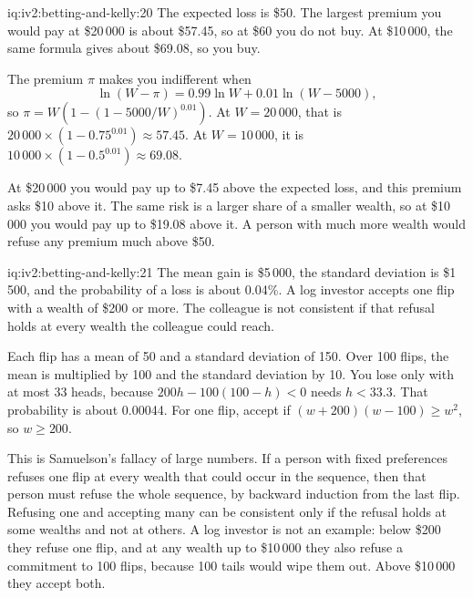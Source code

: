 \begin{solution}{iq:iv2:betting-and-kelly:20}
The expected loss is \$50. The largest premium you would pay at \$20\,000 is about \$57.45, so at \$60 you do not buy. At \$10\,000, the same formula gives about \$69.08, so you buy.

The premium $\pi$ makes you indifferent when
\[
\ln(W - \pi) = 0.99\ln W + 0.01\ln(W - 5000),
\]
so $\pi = W\left(1 - (1 - 5000/W)^{0.01}\right)$. At $W = 20\,000$, that is $20\,000 \times (1 - 0.75^{0.01}) \approx 57.45$. At $W = 10\,000$, it is $10\,000 \times (1 - 0.5^{0.01}) \approx 69.08$.

At \$20\,000 you would pay up to \$7.45 above the expected loss, and this premium asks \$10 above it. The same risk is a larger share of a smaller wealth, so at \$10\,000 you would pay up to \$19.08 above it. A person with much more wealth would refuse any premium much above \$50.

\end{solution}

\begin{solution}{iq:iv2:betting-and-kelly:21}
The mean gain is \$5\,000, the standard deviation is \$1\,500, and the probability of a loss is about 0.04\%. A log investor accepts one flip with a wealth of \$200 or more. The colleague is not consistent if that refusal holds at every wealth the colleague could reach.

Each flip has a mean of 50 and a standard deviation of 150. Over 100 flips, the mean is multiplied by 100 and the standard deviation by 10. You lose only with at most 33 heads, because $200h - 100(100 - h) < 0$ needs $h < 33.3$. That probability is about 0.00044. For one flip, accept if $(w + 200)(w - 100) \geq w^2$, so $w \geq 200$.

This is Samuelson's fallacy of large numbers. If a person with fixed preferences refuses one flip at every wealth that could occur in the sequence, then that person must refuse the whole sequence, by backward induction from the last flip. Refusing one and accepting many can be consistent only if the refusal holds at some wealths and not at others. A log investor is not an example: below \$200 they refuse one flip, and at any wealth up to \$10\,000 they also refuse a commitment to 100 flips, because 100 tails would wipe them out. Above \$10\,000 they accept both.

\end{solution}

